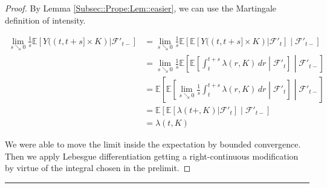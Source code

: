 \documentclass[12pt]{article}
\newcommand{\mb}{\mathbb}
\newcommand{\mc}{\mathcal}
\newcommand{\lin}{\rule{\linewidth}{0.4 pt}}
\newcommand{\ex}[1]{\mb{E}\left[#1\right]}			%
\begin{document}
\begin{proof}
By Lemma \ref{Subsec::Prope:Lem::easier}, we can use the Martingale definition of intensity.

\begin{align*}
\lim_{s\searrow 0}\frac{1}{s}\ex{Y((t,t+s]\times K)|\mc{F}'_{t-}}& = \lim_{s\searrow 0}\frac{1}{s}\ex{\ex{Y((t,t+s]\times K)|\mc{F}'_t}\middle|\mc{F}'_{t-}}\\
&= \lim_{s\searrow 0}\frac{1}{s}\ex{\ex{\int_t^{t+s} \lambda(r,K)\,dr\middle|\mc{F}'_t}\middle|\mc{F}'_{t-}}\\
&= \ex{\ex{\lim_{s \searrow 0} \frac{1}{s}\int_t^{t+s} \lambda(r,K)\,dr\middle|\mc{F}'_t}\middle|\mc{F}'_{t-}}\\
&=\ex{\ex{\lambda(t+,K)|\mc{F}'_t}\middle|\mc{F}'_{t-}}\\
&=\lambda(t,K)
\end{align*}

We were able to move the limit inside the expectation by bounded convergence. Then we apply Lebesgue differentiation getting a right-continuous modification by virtue of the integral chosen in the prelimit.
\end{proof}

\lin
\end{document}
